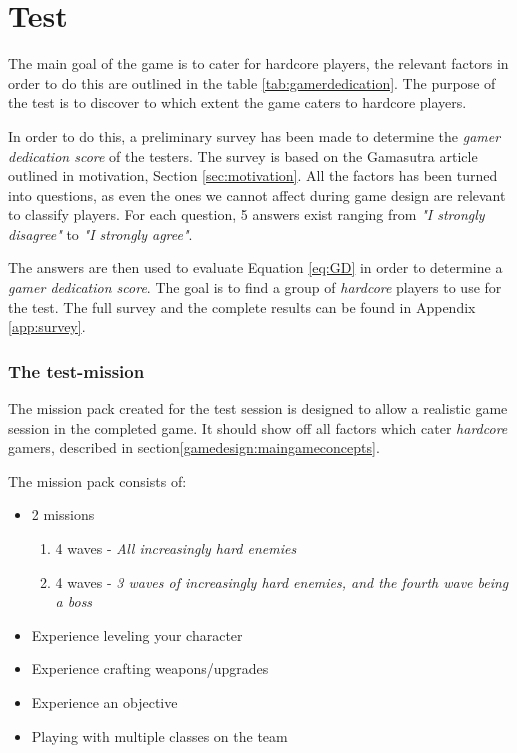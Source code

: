 \chapter{Test}
The main goal of the game is to cater for hardcore players, the relevant factors in order to do this are outlined in the table \ref{tab:gamerdedication}.
The purpose of the test is to discover to which extent the game caters to hardcore players.

In order to do this, a preliminary survey has been made to determine the \emph{gamer dedication score} of the testers.
The survey is based on the Gamasutra article\cite{casual_vs_hardcore} outlined in motivation, Section \ref{sec:motivation}.
All the factors has been turned into questions, as even the ones we cannot affect during game design are relevant to classify players.
For each question, 5 answers exist ranging from \textit{"I strongly disagree"} to \textit{"I strongly agree"}.

The answers are then used to evaluate Equation \ref{eq:GD} in order to determine a \emph{gamer dedication score}.
The goal is to find a group of \emph{hardcore} players to use for the test.
The full survey and the complete results can be found in Appendix \ref{app:survey}.

\subsection{The test-mission}
The mission pack created for the test session is designed to allow a realistic game session in the completed game.
It should show off all factors which cater \emph{hardcore} gamers, described in section\ref{gamedesign:maingameconcepts}.

The mission pack consists of:

\begin{itemize}
	\item 2 missions
	\begin{enumerate}
		\item 4 waves - \emph{All increasingly hard enemies}
		\item 4 waves - \emph{3 waves of increasingly hard enemies, and the fourth wave being a boss}
	\end{enumerate}
	\item Experience leveling your character
	\item Experience crafting weapons/upgrades
	\item Experience an objective
	\item Playing with multiple classes on the team
\end{itemize}

